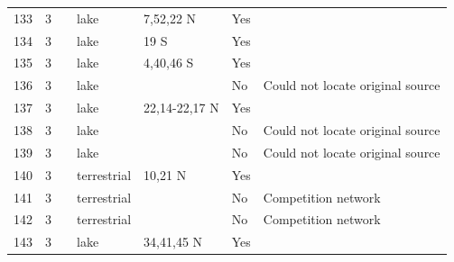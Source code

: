 \documentclass[12pt]{article}
\begin{document}
\begin{landscape}
\begin{table}[h!]
{\begin{tabular}{p{2.8cm}p{1.3cm}p{5.5cm}p{2.2cm}p{2.5cm}lp{3.5cm}}
        133   & 3 & \cite{Beaver1985}  & lake  & 7,52,22 N & Yes   &       \\
        134   & 3 & \cite{Beaver1985}  & lake  & 19 S  & Yes   &       \\
        135   & 3 & \cite{Beaver1985}  & lake  & 4,40,46 S & Yes   &       \\
        136   & 3 & \cite{Bradshaw1983}    & lake  &       & No    & Could not locate original source \\
        137   & 3 & \cite{Corker1984}  & lake  & 22,14-22,17 N & Yes   &       \\
        138   & 3 & \cite{Kitching1983}     & lake  &       & No    & Could not locate original source \\
        139   & 3 & \cite{Kitching1983}  & lake  &       & No    & Could not locate original source \\
        140   & 3 & \cite{Seifert1979}  & terrestrial & 10,21 N & Yes   &       \\
        141   & 3 & \cite{Seifert1976}  & terrestrial &       & No    & Competition network \\
        142   & 3 & \cite{Seifert1976}  & terrestrial &       & No    & Competition network \\
        143   & 3 & \cite{Snow1958}    & lake  & 34,41,45 N & Yes   &       \\
         \hline
      \end{tabular}}%
      \end{table}

        \newpage


\end{landscape}
\end{document}
